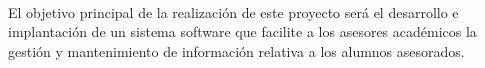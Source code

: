 \paragraph{}El objetivo principal de la realización de este proyecto será el
desarrollo e implantación de un sistema software que facilite a los asesores
académicos la gestión y mantenimiento de información relativa a los alumnos
asesorados.